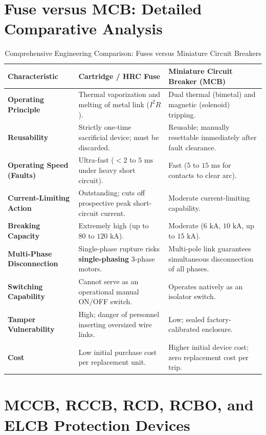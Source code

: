 \section{Fuse versus MCB: Detailed Comparative Analysis}
\label{sec:fuse_vs_mcb}

\begin{table}[htbp]
\centering
\small
\caption{Comprehensive Engineering Comparison: Fuses versus Miniature Circuit Breakers}
\label{tab:fuse_vs_mcb}
\begin{tabularx}{\textwidth}{l X X}
\toprule
\textbf{Characteristic} & \textbf{Cartridge / HRC Fuse} & \textbf{Miniature Circuit Breaker (MCB)} \\
\midrule
\textbf{Operating Principle} & Thermal vaporization and melting of metal link ($I^2R$). & Dual thermal (bimetal) and magnetic (solenoid) tripping. \\
\textbf{Reusability} & Strictly one-time sacrificial device; must be discarded. & Reusable; manually resettable immediately after fault clearance. \\
\textbf{Operating Speed (Faults)} & Ultra-fast ($<2\text{ to } 5\text{ ms}$ under heavy short circuit). & Fast ($5\text{ to } 15\text{ ms}$ for contacts to clear arc). \\
\textbf{Current-Limiting Action} & Outstanding; cuts off prospective peak short-circuit current. & Moderate current-limiting capability. \\
\textbf{Breaking Capacity} & Extremely high (up to $80\text{ to } 120\text{ kA}$). & Moderate ($6\text{ kA}$, $10\text{ kA}$, up to $15\text{ kA}$). \\
\textbf{Multi-Phase Disconnection} & Single-phase rupture risks \textbf{single-phasing} 3-phase motors. & Multi-pole link guarantees simultaneous disconnection of all phases. \\
\textbf{Switching Capability} & Cannot serve as an operational manual ON/OFF switch. & Operates natively as an isolator switch. \\
\textbf{Tamper Vulnerability} & High; danger of personnel inserting oversized wire links. & Low; sealed factory-calibrated enclosure. \\
\textbf{Cost} & Low initial purchase cost per replacement unit. & Higher initial device cost; zero replacement cost per trip. \\
\bottomrule
\end{tabularx}
\end{table}


\section{MCCB, RCCB, RCD, RCBO, and ELCB Protection Devices}
\label{sec:advanced_breakers}

